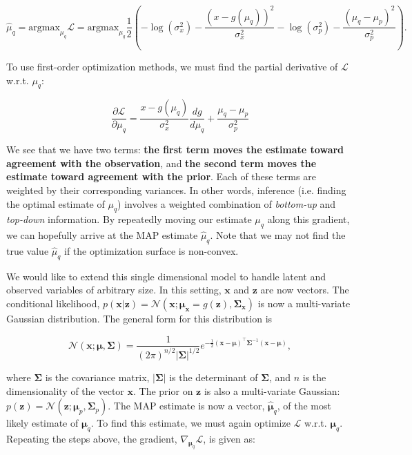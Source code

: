 \begin{equation}
	\hat{\mu}_q = \text{argmax}_{\mu_q} \mathcal{L} =  \text{argmax}_{\mu_q} \frac{1}{2} \left( - \log ( \sigma_x^2 )  - \frac{(x - g(\mu_q))^2}{\sigma_x^2} - \log ( \sigma_p^2 ) -\frac{(\mu_q - \mu_p)^2}{\sigma_p^2} \right).
\end{equation}

\noindent To use first-order optimization methods, we must find the partial derivative of $\mathcal{L}$ w.r.t. $\mu_q$:

\begin{equation}
	\frac{\partial \mathcal{L}}{\partial \mu_q} = \frac{x - g(\mu_q)}{\sigma_x^2} \frac{d g}{d \mu_q} + \frac{\mu_q - \mu_p}{\sigma_p^2}
	\label{eq: 1d gradient}
\end{equation}

\noindent We see that we have two terms: \textbf{the first term moves the estimate toward agreement with the observation}, and \textbf{the second term moves the estimate toward agreement with the prior}. Each of these terms are weighted by their corresponding variances. In other words, inference (i.e. finding the optimal estimate of $\mu_q$) involves a weighted combination of \textit{bottom-up} and \textit{top-down} information. By repeatedly moving our estimate $\mu_q$ along this gradient, we can hopefully arrive at the MAP estimate $\hat{\mu}_q$. Note that we may not find the true value $\hat{\mu}_q$ if the optimization surface is non-convex. 

We would like to extend this single dimensional model to handle latent and observed variables of arbitrary size. In this setting, $\mathbf{x}$ and $\mathbf{z}$ are now vectors. The conditional likelihood, $p(\mathbf{x} | \mathbf{z}) = \mathcal{N} (\mathbf{x}; \bm{\mu}_\mathbf{x} = g(\mathbf{z}), \bm{\Sigma}_\mathbf{x})$ is now a multi-variate Gaussian distribution. The general form for this distribution is

 \begin{equation}
	\mathcal{N} (\mathbf{x}; \bm{\mu}, \bm{\Sigma}) = \frac{1}{(2 \pi)^{n/2} | \bm{\Sigma}|^{1/2}}  e^{-\frac{1}{2}(\mathbf{x} - \bm{\mu})^\intercal \bm{\Sigma}^{-1}(\mathbf{x} - \bm{\mu})},
	\label{eq: multi-variate gaussian}
\end{equation}

\noindent where $\bm{\Sigma}$ is the covariance matrix, $| \bm{\Sigma}|$ is the determinant of $\bm{\Sigma}$, and $n$ is the dimensionality of the vector $\mathbf{x}$. The prior on $\mathbf{z}$ is also a multi-variate Gaussian: $p(\mathbf{z}) = \mathcal{N} (\mathbf{z}; \bm{\mu}_p, \bm{\Sigma}_p)$. The MAP estimate is now a vector, $\hat{\bm{\mu}}_q$, of the most likely estimate of $\bm{\mu}_q$. To find this estimate, we must again optimize $\mathcal{L}$ w.r.t. $\bm{\mu}_q$. Repeating the steps above, the gradient, $\nabla_{\bm{\mu}_q} \mathcal{L}$, is given as:

